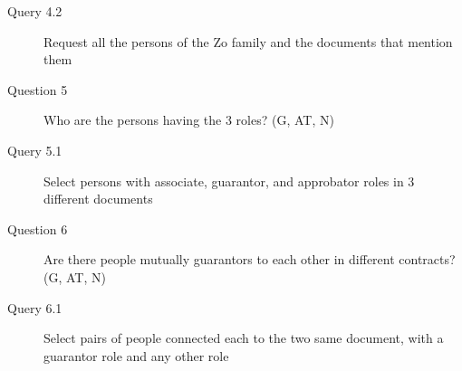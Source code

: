 \begin{enumerate}
\begin{footnotesize}
\begin{description}
    \item[\myindent Query 4.2] Request all the persons of the Zo family and  the documents that mention them
    \item[Question 5] Who are the persons having the 3 roles? (G, AT, N)
    \item[\myindent Query 5.1] Select persons with associate, guarantor, and approbator roles in 3 different documents
    \item[Question 6] Are there people mutually guarantors to each other in different contracts? (G, AT, N)
    \item[\myindent Query 6.1] Select pairs of people connected each to the two same document, with a guarantor role and any other role
    \end{description}
    \end{footnotesize}


\end{enumerate}
